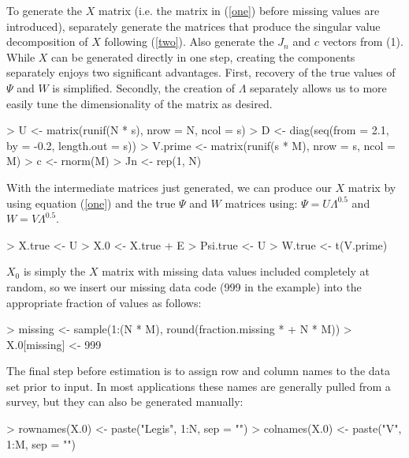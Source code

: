 \documentclass[nojss]{jss}
\begin{document}
To generate the $X$ matrix (i.e. the matrix in (\ref{one}) before missing values are introduced), separately
generate the matrices that produce the singular value decomposition of $X$ following (\ref{two}). Also
generate the $J_n$ and $c$ vectors from (1). While $X$ can be generated directly in one step, creating the
components separately enjoys two significant advantages. First, recovery of the true values of $\Psi$ and $W$
is simplified. Secondly, the creation of $\Lambda$ separately allows us to more easily tune the dimensionality
of the matrix as desired.

\begin{Schunk}
\begin{Sinput}
> U <- matrix(runif(N * s), nrow = N, ncol = s)
> D <- diag(seq(from = 2.1, by = -0.2, length.out = s))
> V.prime <- matrix(runif(s * M), nrow = s, ncol = M)
> c <- rnorm(M)
> Jn <- rep(1, N)
\end{Sinput}
\end{Schunk}

With the intermediate matrices just generated, we can produce our $X$ matrix by using equation (\ref{one})
and the true $\Psi$ and $W$ matrices using: $\Psi = U\Lambda^{0.5}$ and $W = V\Lambda^{0.5}$. 

\begin{Schunk}
\begin{Sinput}
> X.true <- U %
> X.0 <- X.true + E
> Psi.true <- U %
> W.true <- t(V.prime) %
\end{Sinput}
\end{Schunk}

$X_0$ is simply the $X$ matrix with missing data values included completely at random, so we insert
our missing data code (999 in the example) into the appropriate fraction of values as follows:

\begin{Schunk}
\begin{Sinput}
> missing <- sample(1:(N * M), round(fraction.missing * 
+     N * M))
> X.0[missing] <- 999
\end{Sinput}
\end{Schunk}

The final step before estimation is to assign row and column names to the data set prior to input. In
most applications these names are generally pulled from a survey, but they can also be generated
manually:

\begin{Schunk}
\begin{Sinput}
> rownames(X.0) <- paste("Legis", 1:N, sep = "")
> colnames(X.0) <- paste("V", 1:M, sep = "")
\end{Sinput}
\end{Schunk}
\end{document}
